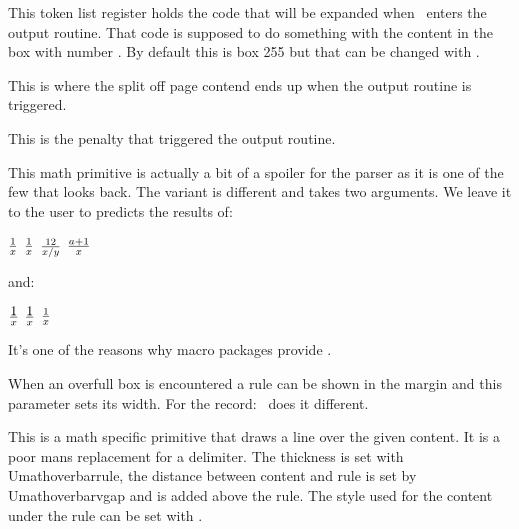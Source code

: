 \startoldprimitive[title={\prm {output}}]

This token list register holds the code that will be expanded when \TEX\ enters
the output routine. That code is supposed to do something with the content in
the box with number . By default this is box 255 but that can be
changed with .

\stopoldprimitive

\startnewprimitive[title={\prm {outputbox}}]

This is where the split off page contend ends up when the output routine is
triggered.

\stopnewprimitive

\startoldprimitive[title={\prm {outputpenalty}}]

This is the penalty that triggered the output routine.

\stopoldprimitive

\startoldprimitive[title={\prm {over}}][obsolete=yes]

This math primitive is actually a bit of a spoiler for the parser as it is one of
the few that looks back. The  variant is different and takes two
arguments. We leave it to the user to predicts the results of:

\starttyping
$    {1} \over {x}    $
$     1  \over  x     $
$    12  \over  x / y $
$ a + 1  \over {x}    $
\stoptyping

and:

\starttyping
$  \textstyle 1  \over x  $
$ {\textstyle 1} \over x  $
$  \textstyle {1 \over x} $
\stoptyping

It's one of the reasons why macro packages provide \type {\frac}.

\stopoldprimitive

\startoldprimitive[title={\prm {overfullrule}}]

When an overfull box is encountered a rule can be shown in the margin and this
parameter sets its width. For the record: \CONTEXT\ does it different.

\stopoldprimitive

\startoldprimitive[title={\prm {overline}}]

This is a math specific primitive that draws a line over the given content. It is
a poor mans replacement for a delimiter. The thickness is set with \prm
{Umathoverbarrule}, the distance between content and rule is set by \prm
{Umathoverbarvgap} and  is added above the rule. The style
used for the content under the rule can be set with .

